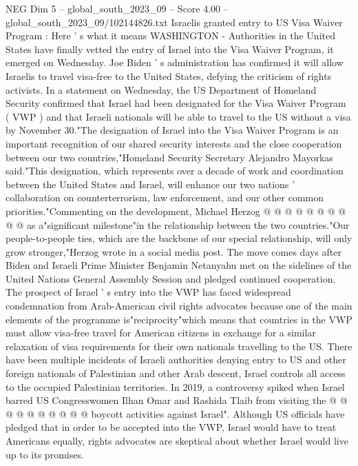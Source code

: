 \begin{textsample}{NEG Dim 5 – global\_south\_2023\_09 – Score 4.00 – global\_south\_2023\_09/102144826.txt}  \label{ex:f5_neg_010}
Israelis granted entry to US Visa Waiver Program : Here ' s what it means WASHINGTON - Authorities in the United States have finally vetted the entry of Israel into the Visa Waiver Program, it emerged on Wednesday.
Joe Biden ' s administration has confirmed it will allow Israelis to travel visa-free to the United States, defying the criticism of rights activists.
In a statement on Wednesday, the US Department of Homeland Security confirmed that Israel had been designated for the Visa Waiver Program ( VWP ) and that Israeli nationals will be able to travel to the US without a visa by November 30."The designation of Israel into the Visa Waiver Program is an important recognition of our shared security interests and the close cooperation between our two countries,"Homeland Security Secretary Alejandro Mayorkas said."This designation, which represents over a decade of work and coordination between the United States and Israel, will enhance our two nations ' collaboration on counterterrorism, law enforcement, and our other common priorities."Commenting on the development, Michael Herzog @ @ @ @ @ @ @ @ @ @ as a"significant milestone"in the relationship between the two countries."Our people-to-people ties, which are the backbone of our special relationship, will only grow stronger,"Herzog wrote in a social media post.
The move comes days after Biden and Israeli Prime Minister Benjamin Netanyahu met on the sidelines of the United Nations General Assembly Session and pledged continued cooperation.
The prospect of Israel ' s entry into the VWP has faced widespread condemnation from Arab-American civil rights advocates because one of the main elements of the programme is"reciprocity"which means that countries in the VWP must allow visa-free travel for American citizens in exchange for a similar relaxation of visa requirements for their own nationals travelling to the US.
There have been multiple incidents of Israeli authorities denying entry to US and other foreign nationals of Palestinian and other Arab descent, Israel controls all access to the occupied Palestinian territories.
In 2019, a controversy spiked when Israel barred US Congresswomen Ilhan Omar and Rashida Tlaib from visiting the @ @ @ @ @ @ @ @ @ @ boycott activities against Israel".
Although US officials have pledged that in order to be accepted into the VWP, Israel would have to treat Americans equally, rights advocates are skeptical about whether Israel would live up to its promises.

\end{textsample}
